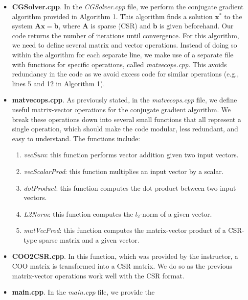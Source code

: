 \documentclass[12pt, a4paper]{article}
\begin{document}
\begin{itemize}
    \item \textbf{CGSolver.cpp}. In the \textit{CGSolver.cpp} file, we perform 
    the  conjugate gradient algorithm provided in Algorithm 1. 
    This algorithm finds a solution $\mathbf{x}^*$ to the system $\mathbf{A}
    \mathbf{x} = \mathbf{b}$, where $\mathbf{A}$ is 
    sparse (CSR) and $\mathbf{b}$ is given beforehand. Our code returns the 
    number of iterations until convergence. For this algorithm, we need to
    define several matrix and vector operations. Instead of doing so within
    the algorithm for each separate line, we make use of a separate file
    with functions for specific operations, called \textit{matvecops.cpp}.
    This avoids redundancy in the code as we avoid excess code for similar
    operations (e.g., lines 5 and 12 in Algorithm 1).
    \item \textbf{matvecops.cpp}. As previously stated, in the 
    \textit{matvecops.cpp} file, we define useful
    matrix-vector operations for the conjugate gradient algorithm. 
    We break these operations down into several small functions that all 
    represent a single operation, which should make the code modular,
    less redundant, and easy to understand. The functions include:
        \begin{enumerate}
            \item \textit{vecSum}: this function performs vector addition 
            given two input vectors.
            \item \textit{vecScalarProd}: this function multiplies an input
            vector by a scalar.
            \item \textit{dotProduct}: this function computes the dot product
            between two input vectors.
            \item \textit{L2Norm}: this function computes the $l_2$-norm of
            a given vector.
            \item \textit{matVecProd}: this function computes the matrix-vector
            product of a CSR-type sparse matrix and a given vector.
        \end{enumerate}
    \item \textbf{COO2CSR.cpp}. In this function, which was provided by the 
    instructor, a COO matrix is transformed into a CSR matrix. We do so as
    the previous matrix-vector operations work well with the CSR format.
    \item \textbf{main.cpp}. In the \textit{main.cpp} file, we provide the 

\end{itemize}
\end{document}
